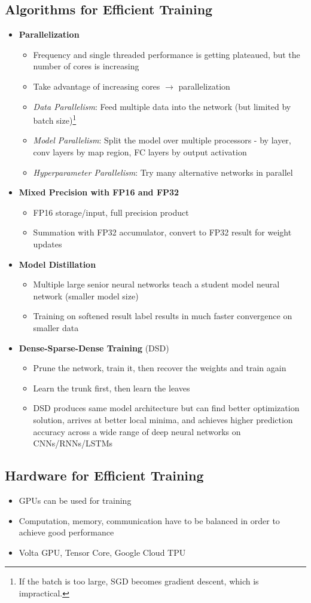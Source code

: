\subsection{Algorithms for Efficient Training}
\begin{itemize}
	\item \textbf{Parallelization}
	\begin{itemize}
		\item Frequency and single threaded performance is getting plateaued, but the number of cores is increasing
		\item Take advantage of increasing cores $\rightarrow$ parallelization
		\item \textit{Data Parallelism}: Feed multiple data into the network (but limited by batch size)\footnote{If the batch is too large, SGD becomes gradient descent, which is impractical.}
		\item \textit{Model Parallelism}: Split the model over multiple processors - by layer, conv layers by map region, FC layers by output activation
		\item \textit{Hyperparameter Parallelism}: Try many alternative networks in parallel
	\end{itemize}
	\item \textbf{Mixed Precision with FP16 and FP32}
	\begin{itemize}
		\item FP16 storage/input, full precision product
		\item Summation with FP32 accumulator, convert to FP32 result for weight updates
	\end{itemize}
	\item \textbf{Model Distillation}
	\begin{itemize}
		\item Multiple large senior neural networks teach a student model neural network (smaller model size)
		\item Training on softened result label results in much faster convergence on smaller data
	\end{itemize}
	\item \textbf{Dense-Sparse-Dense Training} (DSD)
	\begin{itemize}
		\item Prune the network, train it, then recover the weights and train again
		\item Learn the trunk first, then learn the leaves
		\item DSD produces same model architecture but can find better optimization solution,
		arrives at better local minima, and achieves higher prediction accuracy across a wide
		range of deep neural networks on CNNs/RNNs/LSTMs
	\end{itemize}
\end{itemize}

\subsection{Hardware for Efficient Training}
\begin{itemize}
	\item GPUs can be used for training
	\item Computation, memory, communication have to be balanced in order to achieve good performance
	\item Volta GPU, Tensor Core, Google Cloud TPU
\end{itemize}
